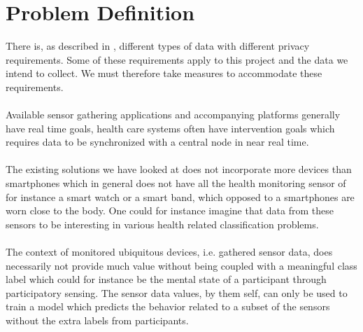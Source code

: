 
\section{Problem Definition} 
\label{sec:problem_definition}
There is, as described in , different types of data with different privacy requirements. Some of these requirements apply to this project and the data we intend to collect. We must therefore take measures to accommodate these requirements.    
\\\\
Available sensor gathering applications and accompanying platforms generally have real time goals, health care systems often have intervention goals which requires data to be synchronized with a central node in near real time. 
\\\\
The existing solutions we have looked at does not incorporate more devices than smartphones which in general does not have all the health monitoring sensor of for instance a smart watch or a smart band, which opposed to a smartphones are worn close to the body. One could for instance imagine that data from these sensors to be interesting in various health related classification problems. 
\\\\
The context of monitored ubiquitous devices, i.e. gathered sensor data, does necessarily not provide much value without being coupled with a meaningful class label which could for instance be the mental state of a participant through participatory sensing. The sensor data values, by them self, can only be used to train a model which predicts the behavior related to a subset of the sensors without the extra labels from participants. 

